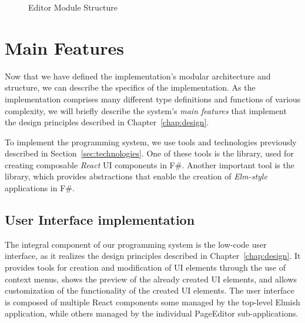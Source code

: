 \begin{figure}[H]
	\centering
	\caption{Editor Module Structure}
	\label{fig:editor-module-structure}
\end{figure}
\medskip
\section{Main Features}
\label{sec:features}
Now that we have defined the implementation's modular architecture and structure, we can describe the specifics of the implementation.
As the implementation comprises many different type definitions and functions of various complexity,
we will briefly describe the system's \emph{main features} that implement the design principles described in Chapter~\ref{chap:design}.

To implement the programming system, we use tools and technologies previously described in Section~\ref{sec:technologies}.
One of these tools is the \citet{feliz} library, used for creating composable \emph{React} UI components in F\#.
Another important tool is the \citet{elmish} library, which provides abstractions that enable the creation of \emph{Elm-style} applications in F\#.

\medskip
\subsection{User Interface implementation}
The integral component of our programming system is the low-code user interface, as it realizes the design principles described in Chapter~\ref{chap:design}.
It provides tools for creation and modification of UI elements through the use of context menus, shows the preview of the already created UI elements, and allows customization of the functionality of the created UI elements.
The user interface is composed of multiple React components some managed by the top-level Elmish application, while others managed by the individual PageEditor sub-applications.

